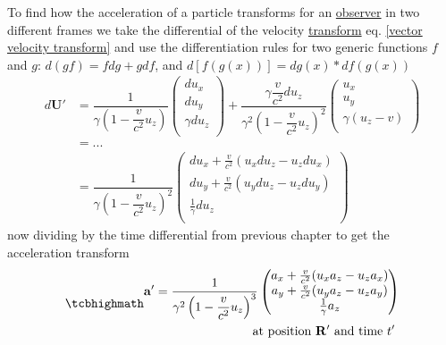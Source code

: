 To find how the acceleration of a particle transforms for an \hyperlink{def-observer}{observer} in two different frames we take the differential of the velocity \hyperlink{def-transform}{transform} eq. \eqref{vector velocity transform} and use the differentiation rules for two generic functions $f$ and $g$: $d(gf)=f dg+g df$, and $d[f(g(x))]= dg(x) * df(g(x))$
\begin{equation}%
	\begin{aligned}
		d\mathbf{U'} & = \dfrac{1}{\gamma\left(1- \dfrac{v}{c^2} u_z\right) }
		\begin{pmatrix}
			du_x \\ du_y  \\ \gamma du_z  \\
		\end{pmatrix} + \dfrac{\gamma \dfrac{v}{c^2} du_z}{\gamma^2\left(1- \dfrac{v}{c^2} u_z\right)^2 }
		\begin{pmatrix}
			u_x \\ u_y  \\ \gamma \left( u_z  - v  \right) \\
		\end{pmatrix}                           \\
		             & = ...                                                     \\
		             & =  \dfrac{1}{\gamma\left(1- \dfrac{v}{c^2} u_z\right)^2 }
		\begin{pmatrix}
			du_x + \frac{v}{c^2}( u_x du_z - u_z du_x) \\ du_y + \frac{v}{c^2}( u_y du_z - u_z du_y) \\ \frac{1}{\gamma} du_z \\
		\end{pmatrix}
	\end{aligned}
\end{equation}%
now dividing by the time differential from previous chapter to get the acceleration transform
\begin{equation}%
	\mhl{
		\begin{aligned}
			\mathbf{a'} =  \dfrac{1}{\gamma^2\left(1- \dfrac{v}{c^2} u_z\right)^3 }
			\begin{pmatrix}
				a_x + \frac{v}{c^2}(u_x a_z - u_z a_x) \\ a_y + \frac{v}{c^2}(u_y a_z - u_z a_y) \\ \frac{1}{\gamma} a_z \\
			\end{pmatrix}
			\\
			\text{at position $\mathbf{R'}$ and time $t'$ }
		\end{aligned}
	}
\end{equation}%


